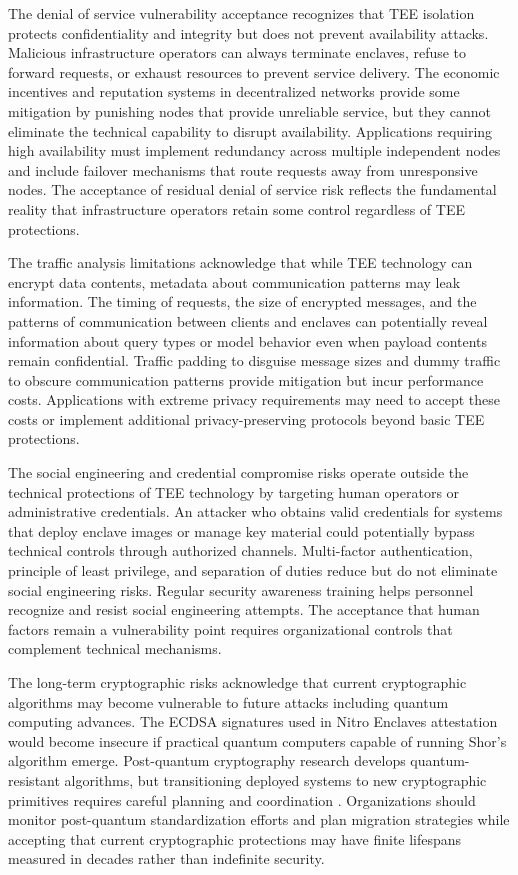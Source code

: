 The denial of service vulnerability acceptance recognizes that TEE isolation protects confidentiality and integrity but does not prevent availability attacks. Malicious infrastructure operators can always terminate enclaves, refuse to forward requests, or exhaust resources to prevent service delivery. The economic incentives and reputation systems in decentralized networks provide some mitigation by punishing nodes that provide unreliable service, but they cannot eliminate the technical capability to disrupt availability. Applications requiring high availability must implement redundancy across multiple independent nodes and include failover mechanisms that route requests away from unresponsive nodes. The acceptance of residual denial of service risk reflects the fundamental reality that infrastructure operators retain some control regardless of TEE protections.

The traffic analysis limitations acknowledge that while TEE technology can encrypt data contents, metadata about communication patterns may leak information. The timing of requests, the size of encrypted messages, and the patterns of communication between clients and enclaves can potentially reveal information about query types or model behavior even when payload contents remain confidential. Traffic padding to disguise message sizes and dummy traffic to obscure communication patterns provide mitigation but incur performance costs. Applications with extreme privacy requirements may need to accept these costs or implement additional privacy-preserving protocols beyond basic TEE protections.

The social engineering and credential compromise risks operate outside the technical protections of TEE technology by targeting human operators or administrative credentials. An attacker who obtains valid credentials for systems that deploy enclave images or manage key material could potentially bypass technical controls through authorized channels. Multi-factor authentication, principle of least privilege, and separation of duties reduce but do not eliminate social engineering risks. Regular security awareness training helps personnel recognize and resist social engineering attempts. The acceptance that human factors remain a vulnerability point requires organizational controls that complement technical mechanisms.

The long-term cryptographic risks acknowledge that current cryptographic algorithms may become vulnerable to future attacks including quantum computing advances. The ECDSA signatures used in Nitro Enclaves attestation would become insecure if practical quantum computers capable of running Shor's algorithm emerge. Post-quantum cryptography research develops quantum-resistant algorithms, but transitioning deployed systems to new cryptographic primitives requires careful planning and coordination \cite{post_quantum_nist}. Organizations should monitor post-quantum standardization efforts and plan migration strategies while accepting that current cryptographic protections may have finite lifespans measured in decades rather than indefinite security.

